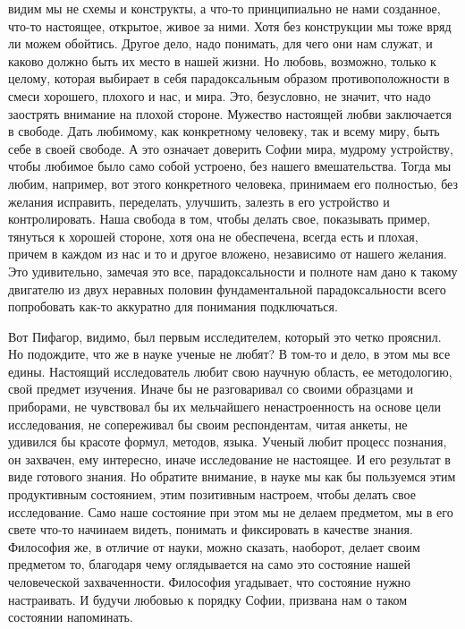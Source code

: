 видим мы не схемы и конструкты, а что-то принципиально не нами созданное, что-то
настоящее, открытое, живое за ними. Хотя без конструкции мы тоже вряд ли можем
обойтись. Другое дело, надо понимать, для чего они нам служат, и каково должно
быть их место в нашей жизни. Но любовь, возможно, только к целому, которая
выбирает в себя парадоксальным образом противоположности в смеси хорошего,
плохого и нас, и мира. Это, безусловно, не значит, что надо заострять внимание
на плохой стороне. Мужество настоящей любви заключается в свободе. Дать
любимому, как конкретному человеку, так и всему миру, быть себе в своей свободе.
А это означает доверить Софии мира, мудрому устройству, чтобы любимое было само
собой устроено, без нашего вмешательства. Тогда мы любим, например, вот этого
конкретного человека, принимаем его полностью, без желания исправить,
переделать, улучшить, залезть в его устройство и контролировать. Наша свобода в
том, чтобы делать свое, показывать пример, тянуться к хорошей стороне, хотя она
не обеспечена, всегда есть и плохая, причем в каждом из нас и то и другое
вложено, независимо от нашего желания. Это удивительно, замечая это все,
парадоксальности и полноте нам дано к такому двигателю из двух неравных половин
фундаментальной парадоксальности всего попробовать как-то аккуратно для
понимания подключаться.

Вот Пифагор, видимо, был первым исследителем, который
это четко прояснил. Но подождите, что же в науке ученые не любят? В том-то и
дело, в этом мы все едины. Настоящий исследователь любит свою научную область,
ее методологию, свой предмет изучения. Иначе бы не разговаривал со своими
образцами и приборами, не чувствовал бы их мельчайшего ненастроенность на основе
цели исследования, не сопереживал бы своим респондентам, читая анкеты, не
удивился бы красоте формул, методов, языка. Ученый любит процесс познания, он
захвачен, ему интересно, иначе исследование не настоящее. И его результат в виде
готового знания. Но обратите внимание, в науке мы как бы пользуемся этим
продуктивным состоянием, этим позитивным настроем, чтобы делать свое
исследование. Само наше состояние при этом мы не делаем предметом, мы в его
свете что-то начинаем видеть, понимать и фиксировать в качестве знания.
Философия же, в отличие от науки, можно сказать, наоборот, делает своим
предметом то, благодаря чему оглядывается на само это состояние нашей
человеческой захваченности. Философия угадывает, что состояние нужно
настраивать. И будучи любовью к порядку Софии, призвана нам о таком состоянии
напоминать. 

